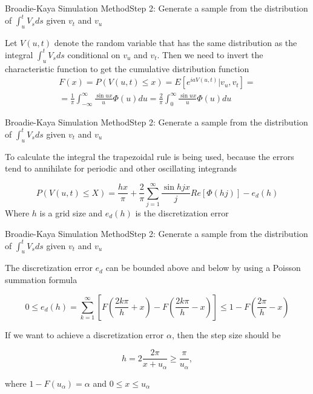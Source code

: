 \begin{frame}{Broadie-Kaya Simulation Method}{Step 2:  Generate a sample from the distribution of $\int_{u}^t V_s ds$ given $v_t$ and $v_u$}
    
    Let $V(u,t)$  denote the random
    variable that has the same distribution as the integral $\int_{u}^t V_s ds$ conditional on $v_u$ and $v_t$.    
    Then we need to invert the characteristic function to get the cumulative distribution function
    \begin{multline}
        F(x) = P(V(u, t) \leq x) = E\left[ e^{iaV(u,t)} \Big| v_u, v_t\right] =\\= \frac{1}{\pi} \int_{-\infty}^\infty \frac{\sin ux}{u} \Phi(u) du 
        = \frac{2}{\pi} \int_{0}^\infty \frac{\sin ux}{u} \Phi(u) du
    \end{multline}
    
    
\end{frame}

\begin{frame}{Broadie-Kaya Simulation Method}{Step 2:  Generate a sample from the distribution of $\int_{u}^t V_s ds$ given $v_t$ and $v_u$}

    To calculate the integral the trapezoidal rule is being used, because the errors tend to annihilate for periodic and other oscillating integrands

    \begin{equation}
        P(V(u, t) \leq X) = \frac{hx}{\pi} + \frac{2}{\pi} \sum_{j=1}^\infty \frac{\sin hjx}{j} Re[\Phi(hj)] - e_d(h)
    \end{equation}
    Where $h$ is a grid size and $e_d(h)$ is the discretization   error

\end{frame}

\begin{frame}{Broadie-Kaya Simulation Method}{Step 2:  Generate a sample from the distribution of $\int_{u}^t V_s ds$ given $v_t$ and $v_u$}

    The discretization error $e_d$ can be bounded above and
below by using a Poisson summation formula 

    \begin{equation}
        0 \leq e_d(h) = \sum_{k=1}^\infty\left[ F\left(\frac{2k\pi}{h} + x\right) - F\left(\frac{2k\pi}{h} - x\right)\right] \leq 1 - F\left(\frac{2\pi}{h} - x\right)
    \end{equation}

    If we want to achieve a discretization error $\alpha$, then the
    step size should be

    \begin{equation}
        h = 2\frac{2\pi}{x+ u_\alpha} \geq \frac{\pi}{u_\alpha},
    \end{equation}

    where $1-F(u_\alpha) = \alpha$ and $0 \leq x \leq u_\alpha$


\end{frame}



